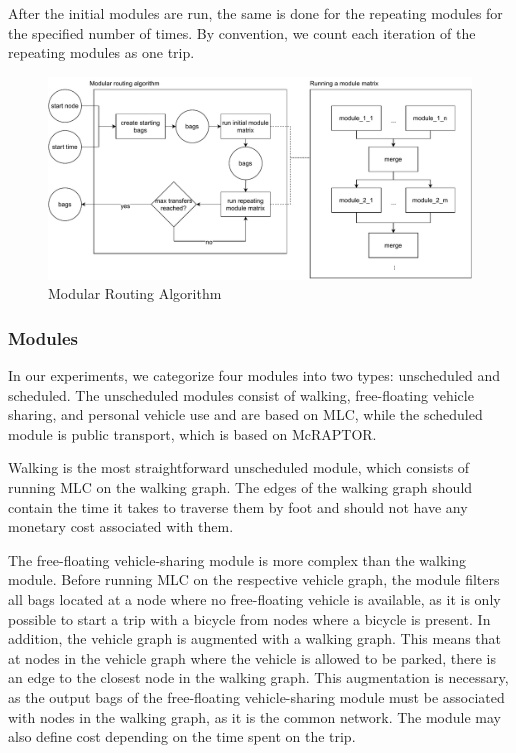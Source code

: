 After the initial modules are run, the same is done for the repeating modules for the specified number of times.
By convention, we count each iteration of the repeating modules as one trip.

\begin{figure}
    \centering
    \includegraphics[scale=0.40]{Figures/method/modular_routing_algorithm}
    \caption{Modular Routing Algorithm}
    \label{fig:modular_routing_algorithm}
\end{figure}


\subsubsection{Modules}
\label{subsubsec:modules}

In our experiments, we categorize four modules into two types: unscheduled and scheduled. 
The unscheduled modules consist of walking, free-floating vehicle sharing, and personal vehicle use and are based on MLC, while the scheduled module is public transport, which is based on McRAPTOR.

Walking is the most straightforward unscheduled module, which consists of running MLC on the walking graph.
The edges of the walking graph should contain the time it takes to traverse them by foot and should not have any monetary cost associated with them.

The free-floating vehicle-sharing module is more complex than the walking module.
Before running MLC on the respective vehicle graph, the module filters all bags located at a node where no free-floating vehicle is available, as it is only possible to start a trip with a bicycle from nodes where a bicycle is present.
In addition, the vehicle graph is augmented with a walking graph. 
This means that at nodes in the vehicle graph where the vehicle is allowed to be parked, there is an edge to the closest node in the walking graph.
This augmentation is necessary, as the output bags of the free-floating vehicle-sharing module must be associated with nodes in the walking graph, as it is the common network.
The module may also define cost depending on the time spent on the trip.

